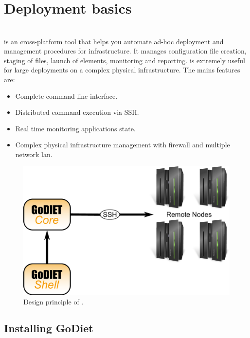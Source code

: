 \section{Deployment basics}
\label{sec:deployBasics}


\section{\godiet}
\label{sec:deployGoDIET}

\godiet is an cross-platform tool that helps you automate ad-hoc deployment and
management procedures for \diet infrastructure. It manages
configuration file creation, staging of files, launch of elements, monitoring
and reporting.  \godiet is extremely useful for large deployments on a complex
physical infrastructure. The mains features are:
\begin{itemize}
  \item Complete command line interface.
  \item Distributed command execution via SSH.
  \item Real time monitoring applications state.
  \item Complex physical infrastructure management with firewall and multiple
    network lan.
\end{itemize}
\begin{figure}[h]
  \centering
  \includegraphics[width=16cm]{fig/schemaPhilippe}
  \caption{Design principle of \godiet.\label{fig:GODIETDesign}}
\end{figure}




\subsection{Installing GoDiet}

